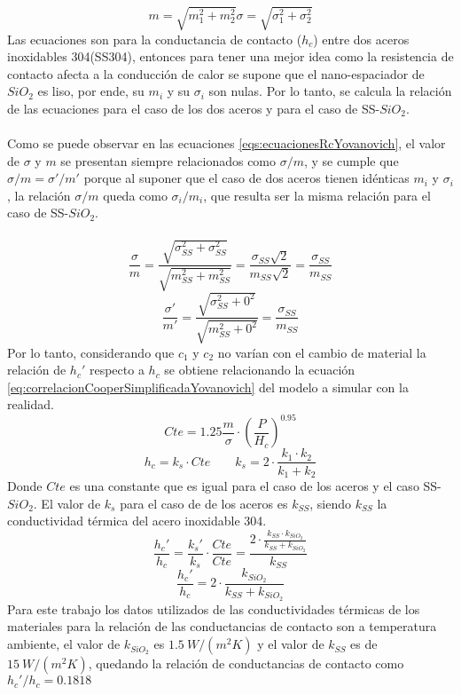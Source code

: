 \begin{subequations}
\begin{equation}
m=\sqrt{m_1^2+m_2^2}
\label{eq:mRMS}
\end{equation}
\begin{equation}
\sigma=\sqrt{\sigma_1^2+\sigma_2^2}
\label{eq:sigmaRMS}
\end{equation}
\label{eqs:RMS}
\end{subequations}
Las ecuaciones son para la conductancia de contacto ($h_c$) entre dos aceros inoxidables 304(SS304), entonces para tener una mejor idea como la resistencia de contacto afecta a la conducción de calor se supone que el nano-espaciador de $SiO_2$ es liso, por ende, su $m_i$ y su $\sigma_i$ son nulas. Por lo tanto, se calcula la relación de las ecuaciones para el caso de los dos aceros y para el caso de SS-$SiO_2$.\\\\
Como se puede observar en las ecuaciones \ref{eqs:ecuacionesRcYovanovich}, el valor de $\sigma$ y $m$ se presentan siempre relacionados como $\sigma / m$, y se cumple que $\sigma /m =\sigma ' / m'$ porque al suponer que el caso de dos aceros tienen idénticas $m_i$ y $\sigma_i$, la relación $\sigma / m$ queda como $\sigma_i / m_i$, que resulta ser la misma relación para el caso de SS-$SiO_2$.\\\\
\[ \frac{\sigma}{m}=\frac{\sqrt{\sigma_{SS}^2+\sigma_{SS}^2}}{\sqrt{m_{SS}^2+m_{SS}^2}}=\frac{\sigma_{SS}\sqrt{2}}{m_{SS}\sqrt{2}} =\frac{\sigma_{SS}}{m_{SS}}\]
\[ \frac{\sigma'}{m'}=\frac{\sqrt{\sigma_{SS}^2+0^2}}{\sqrt{m_{SS}^2+0^2}}=\frac{\sigma_{SS}}{m_{SS}} \]
Por lo tanto, considerando que $c_1$ y $c_2$ no varían con el cambio de material la relación de $h_c'$ respecto a $h_c$ se obtiene relacionando la ecuación \ref{eq:correlacionCooperSimplificadaYovanovich} del modelo a simular con la realidad.
\[Cte=1.25\frac{m}{\sigma}\cdot \left(\dfrac{P}{H_c}\right)^{0.95} \]
\[h_c=k_s\cdot Cte \qquad k_s=2\cdot \frac{k_1\cdot k_2}{k_1+k_2}\]
Donde $Cte$ es una constante que es igual para el caso de los aceros y el caso SS-$SiO_2$. El valor de $k_s$ para el caso de de los aceros es $k_{SS}$, siendo $k_{SS}$ la conductividad térmica del acero inoxidable 304. 
\[ \frac{h_c'}{h_c}=\frac{k_s'}{k_s}\cdot \frac{Cte}{Cte}=\frac{2 \cdot \frac{k_{SS}\cdot k_{SiO_2}}{k_{SS}+k_{SiO_2}}}{k_{SS}}\]
\begin{equation}
\frac{h_c'}{h_c}=2\cdot \frac{k_{SiO_2}}{k_{SS}+k_{SiO_2}}
\label{eq:relacion_conductividadesTermicas}
\end{equation}
Para este trabajo los datos utilizados de las conductividades térmicas de los materiales para la relación de las conductancias de contacto son a temperatura ambiente, el valor de $k_{SiO_2}$ es $1.5 \ W/\left( m^2 K\right)$ y el valor de $k_{SS}$ es de $15 \ W/\left( m^2 K\right)$, quedando la relación de conductancias de contacto como ${h_c'}/{h_c}=0.1818$

